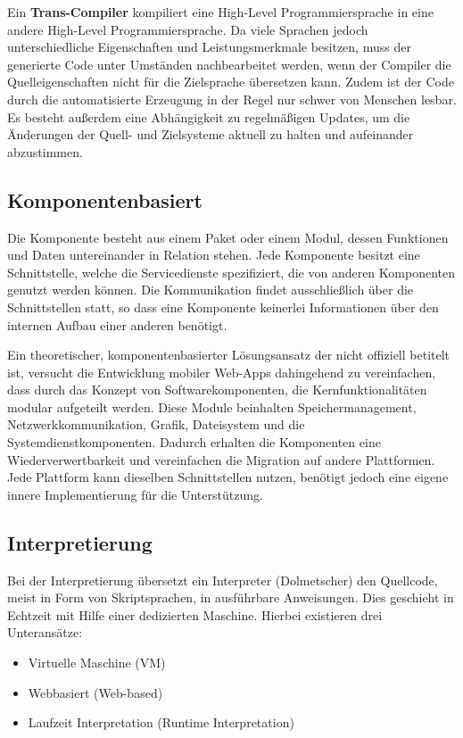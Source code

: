 \bigskip
Ein \textbf{Trans-Compiler} kompiliert eine High-Level Programmiersprache in eine andere High-Level Programmiersprache. Da viele Sprachen jedoch unterschiedliche Eigenschaften und Leistungsmerkmale besitzen, muss der generierte Code unter Umständen nachbearbeitet werden, wenn der Compiler die Quelleigenschaften nicht für die Zielsprache übersetzen kann. Zudem ist der Code durch die automatisierte Erzeugung in der Regel nur schwer von Menschen lesbar. Es besteht außerdem eine Abhängigkeit zu regelmäßigen Updates, um die Änderungen der Quell- und Zielsysteme aktuell zu halten und aufeinander abzustimmen.

\subsection{Komponentenbasiert}
Die Komponente besteht aus einem Paket oder einem Modul, dessen Funktionen und Daten untereinander in Relation stehen. Jede Komponente besitzt eine Schnittstelle, welche die Servicedienste spezifiziert, die von anderen Komponenten genutzt werden können. Die Kommunikation findet ausschließlich über die Schnittstellen statt, so dass eine Komponente keinerlei Informationen über den internen Aufbau einer anderen benötigt. 

\bigskip
Ein theoretischer, komponentenbasierter Lösungsansatz der nicht offiziell betitelt ist, versucht die Entwicklung mobiler Web-Apps dahingehend zu vereinfachen, dass durch das Konzept von Softwarekomponenten, die Kernfunktionalitäten modular aufgeteilt werden. Diese Module beinhalten Speichermanagement, Netzwerkkommunikation, Grafik, Dateisystem und die Systemdienstkomponenten. Dadurch erhalten die Komponenten eine Wiederverwertbarkeit und vereinfachen die Migration auf andere Plattformen. Jede Plattform kann dieselben Schnittstellen nutzen, benötigt jedoch eine eigene innere Implementierung für die Unterstützung. 

\subsection{Interpretierung}
Bei der Interpretierung übersetzt ein Interpreter (Dolmetscher) den Quellcode, meist in Form von Skriptsprachen, in ausführbare Anweisungen. Dies geschieht in Echtzeit mit Hilfe einer dedizierten Maschine. Hierbei existieren drei Unteransätze:

\begin{itemize}
	\item Virtuelle Maschine (VM)
	\item Webbasiert (Web-based)
	\item Laufzeit Interpretation (Runtime Interpretation)
\end{itemize}

